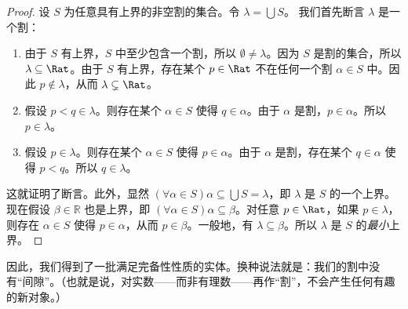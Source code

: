 \documentclass[../../../include/open-logic-section]{subfiles}
\begin{document}
\begin{proof}
设 $S$ 为任意具有上界的非空割的集合。令 $\lambda = \bigcup S$。
我们首先断言 $\lambda$ 是一个割：
\begin{enumerate}
\item 由于 $S$ 有上界，$S$ 中至少包含一个割，所以 $\emptyset \neq \lambda$。因为 $S$ 是割的集合，所以 $\lambda \subseteq \Rat$。由于 $S$ 有上界，存在某个 $p \in \Rat$ 不在任何一个割 $\alpha \in S$ 中。因此 $p\notin \lambda$，从而 $\lambda \subsetneq \Rat$。
\item 假设 $p < q \in \lambda$。则存在某个 $\alpha \in S$ 使得 $q \in \alpha$。由于 $\alpha$ 是割，$p \in \alpha$。所以 $p \in \lambda$。
\item 假设 $p \in \lambda$。则存在某个 $\alpha \in S$ 使得 $p \in \alpha$。由于 $\alpha$ 是割，存在某个 $q \in \alpha$ 使得 $p < q$。所以 $q \in \lambda$。
\end{enumerate}
这就证明了断言。此外，显然 $(\forall \alpha \in S)\alpha
\subseteq \bigcup S = \lambda$，即 $\lambda$ 是 $S$ 的一个上界。现在假设 $\beta \in \mathbb{R}$ 也是上界，即 $(\forall \alpha \in S)\alpha \subseteq \beta$。对任意 $p \in \Rat$，如果 $p \in \lambda$，则存在 $\alpha \in S$ 使得 $p \in \alpha$，从而 $p \in \beta$。一般地，有 $\lambda \subseteq \beta$。所以 $\lambda$ 是 $S$ 的\emph{最小}上界。
\end{proof}

因此，我们得到了一批满足完备性性质的实体。换种说法就是：我们的割中没有“间隙”。（也就是说，对实数——而非有理数——再作“割”，不会产生任何有趣的新对象。）
\end{document}
